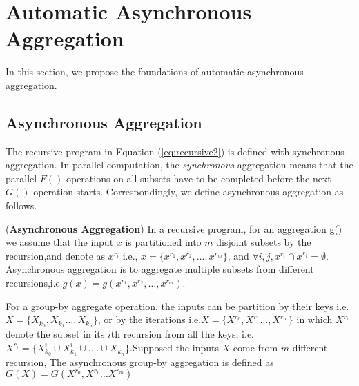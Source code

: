 \section{Automatic Asynchronous Aggregation}
\label{sec:async}
In this section, we propose the foundations of automatic asynchronous aggregation.

\subsection{Asynchronous Aggregation}
\label{sec:async:async}

The recursive program in Equation (\ref{eq:recursive2}) is defined with synchronous aggregation. In parallel computation, the \emph{synchronous} aggregation means that the parallel $F()$ operations on all subsets have to be completed before the next $G()$ operation starts. %
Correspondingly, we define asynchronous aggregation as follows.

\begin{definition}
	\label{def:asyncaggre}
	(\textbf{Asynchronous Aggregation}) In a recursive program, for an aggregation g() we assume that the input  $x$  is partitioned into $m$ disjoint subsets by the recursion,and denote as $x^{r_i}$ i.e., $x=\{x^{r_1},x^{r_2},\ldots,x^{r_m}\}$, and $\forall i,j, x^{r_i}\cap x^{r_j}=\emptyset$. Asynchronous aggregation is to aggregate multiple subsets from different recursions,i.e.$g(x)=g(x^{r_1},x^{r_2},\ldots,x^{r_m})$.


For a group-by aggregate operation. the inputs can be partition by their keys i.e.$X=\{X_{k_0},X_{k_1}\ldots,X_{k_n}\}$, or by the iterations i.e.$X=\{X^{r_0},X^{r_1}\ldots,X^{r_m}\}$ in which $X^{r_i}$ denote the subset in its $i$th recursion from all the keys, i.e.$X^{r_i}=\{X_{k_0}^i\cup X_{k_1}^i\cup ....\cup X_{k_n}\}$.Supposed the inputs $X$ come from $m$ different recursion, The asynchronous group-by  aggregation is defined as $G(X)=G(X^{r_0},X^{r_1}\ldots X^{r_m})$
\end{definition}

